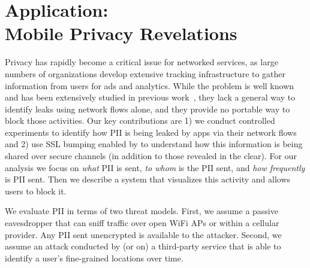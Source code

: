 \section{Application: \\
Mobile Privacy Revelations}
\label{sec:characterize-app}
%
%
Privacy has rapidly become a critical issue for networked services, as large numbers of organizations develop 
extensive tracking infrastructure to gather information from users for ads and analytics. While the problem 
is well known and has been extensively studied in previous work~\cite{roesner:webtrackers,leontiadis:mobileads,vallina-rod:ads}, they lack a general 
way to identify leaks using network flows alone, and they provide no portable way to block those 
activities. Our key 
contributions are 1) we conduct controlled experiments to identify how PII is being leaked by apps via 
their network flows and 2) use SSL bumping enabled by \platname{} to understand how this information is being shared over 
secure channels (in addition to those revealed in the clear). 
For our analysis we focus on {\it what} PII is sent,  {\it to whom} is the PII sent, and {\it how frequently} is PII sent.
Then we describe a system that visualizes 
this activity and allows users to block it.

We evaluate PII in terms of two threat models. First, we assume a passive eavesdropper that can sniff 
traffic over open WiFi APs or within a cellular provider. Any PII sent unencrypted is available to the attacker. 
Second, we assume an attack conducted by (or on) a third-party service that is able to identify a user's fine-grained locations 
over time. 

